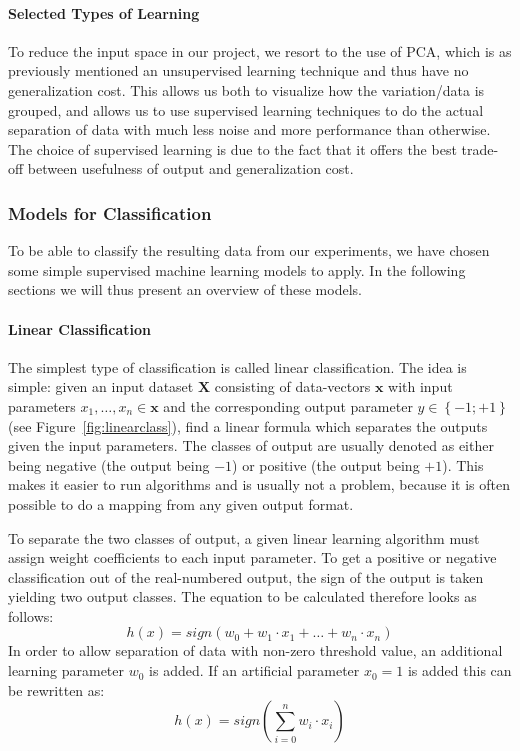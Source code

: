 \paragraph{Selected Types of Learning}
\label{par:SelectedTypesofLearning}
To reduce the input space in our project, we resort to the use of PCA, which is as previously mentioned an unsupervised learning technique
and thus have no generalization cost. This allows us both to visualize how the variation/data is grouped, and allows us to
use supervised learning techniques to do the actual separation of data with much less noise and more performance than otherwise.
The choice of supervised learning is due to the fact that it offers the best trade-off between usefulness of output and generalization cost.

\subsubsection{Models for Classification}
\label{ssub:ModelsforClassification}
To be able to classify the resulting data from our experiments, we have chosen some simple supervised machine learning models to apply.
In the following sections we will thus present an overview of these models.
\paragraph{Linear Classification}
\label{par:LinearClassification}
The simplest type of classification is called linear classification.
The idea is simple: given an input dataset $\mathbf{X}$ consisting of data-vectors $\mathbf{x}$ with input parameters $x_1, \dots, x_n \in \mathbf{x}$ and the corresponding output parameter $y \in \left\{-1;+1\right\}$ (see Figure~\ref{fig:linearclass}), 
find a linear formula which separates the outputs given the input parameters.
The classes of output are usually denoted as either being negative (the output being $-1$) or positive (the output being $+1$). 
This makes it easier to run algorithms and is usually not a problem, because it is often possible to do a mapping from any given output format.\\
\begin{minipage}{\linewidth}
\centering
{}
\label{fig:linearclass}
\end{minipage}
To separate the two classes of output, a given linear learning algorithm must assign weight coefficients to each input parameter.
To get a positive or negative classification out of the real-numbered output, the sign of the output is taken yielding two output classes.
The equation to be calculated therefore looks as follows:
$$ h(x) = sign\left(w_0 + w_1 \cdot x_1 + \dots + w_n \cdot x_n \right) $$
In order to allow separation of data with non-zero threshold value, an additional learning parameter $w_0$ is added.
If an artificial parameter $x_0=1$ is added this can be rewritten as:
$$ h(x) = sign\left(\sum_{i=0}^n{w_i \cdot x_i}\right) $$

